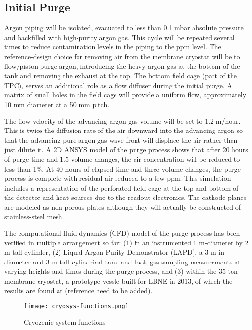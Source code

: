 \subsection{Initial Purge} 

Argon piping will be isolated, evacuated to less than 0.1 mbar absolute pressure and backfilled
with high-purity argon gas. This cycle will be repeated several times to reduce contamination
levels in the piping to the ppm level. The reference-design choice for removing air from the
membrane cryostat will be to flow/piston-purge argon, introducing the heavy argon gas at the
bottom of the tank and removing the exhaust at the top. The bottom field cage (part of the
TPC), serves an additional role as a flow diffuser during the initial
purge. A matrix of small holes in the field cage will provide a uniform flow, approximately
10 mm diameter at a 50 mm pitch. 

The flow velocity of the advancing argon-gas volume will be set to 1.2 m/hour. 
This is twice the diffusion rate of the air downward into the advancing argon 
so that the advancing pure argon-gas wave front will displace the air rather 
than just dilute it. A 2D ANSYS model of the purge process shows that after 
20 hours of purge time and 1.5 volume changes, the air concentration will 
be reduced to less than 1\%. At 40 hours of elapsed time and three volume
changes, the purge process is complete with residual air reduced to a few ppm. This
simulation includes a representation of the perforated field cage at the top and bottom of the
detector and heat sources due to the readout electronics. The cathode
planes are modeled as non-porous plates although they will actually be constructed of stainless-steel
mesh.

The computational fluid dynamics (CFD) model of the purge process has been verified in multiple arrangement so far: (1) in an instrumented 1 m-diameter by 2 m-tall cylinder, (2) Liquid Argon Purity Demonstrator (LAPD), a 3 m in diameter and 3 m tall cylindrical tank and took gas-sampling measurements at varying heights and times during the purge process, and (3) within the 35 ton membrane cryostat, a prototype vessle built for LBNE in 2013, of which the results are found at (reference need to be added). \begin{figure}[htbp]
\centering
\texttt{[image: cryosys-functions.png]} 
\caption{Cryogenic system functions}
\label{fig:v5ch2-LBNF-block-diagram-2014}
\end{figure}

